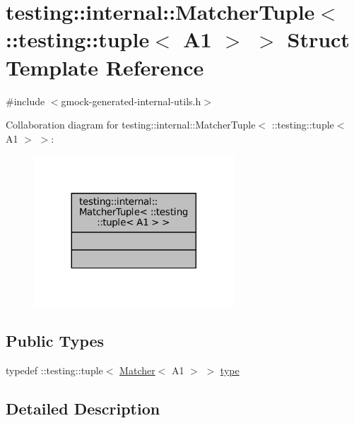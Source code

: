 \hypertarget{structtesting_1_1internal_1_1MatcherTuple_3_01_1_1testing_1_1tuple_3_01A1_01_4_01_4}{}\section{testing\+:\+:internal\+:\+:Matcher\+Tuple$<$ \+:\+:testing\+:\+:tuple$<$ A1 $>$ $>$ Struct Template Reference}
\label{structtesting_1_1internal_1_1MatcherTuple_3_01_1_1testing_1_1tuple_3_01A1_01_4_01_4}


{\ttfamily \#include $<$gmock-\/generated-\/internal-\/utils.\+h$>$}



Collaboration diagram for testing\+:\+:internal\+:\+:Matcher\+Tuple$<$ \+:\+:testing\+:\+:tuple$<$ A1 $>$ $>$\+:
\nopagebreak
\begin{figure}[H]
\begin{center}
\leavevmode
\includegraphics[width=212pt]{structtesting_1_1internal_1_1MatcherTuple_3_01_1_1testing_1_1tuple_3_01A1_01_4_01_4__coll__graph}
\end{center}
\end{figure}
\subsection*{Public Types}
\begin{DoxyCompactItemize}
\item 
typedef \+::testing\+::tuple$<$ \hyperlink{classtesting_1_1Matcher}{Matcher}$<$ A1 $>$ $>$ \hyperlink{structtesting_1_1internal_1_1MatcherTuple_3_01_1_1testing_1_1tuple_3_01A1_01_4_01_4_a8463ac100366f7e8b6ad1035e42ec4b0}{type}
\end{DoxyCompactItemize}


\subsection{Detailed Description}
